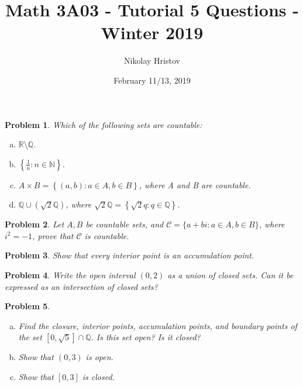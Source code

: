 \documentclass[11pt]{article}
\theoremstyle{plain}
\newtheorem{problem}{Problem}
\theoremstyle{remark}
\newcommand {\mbR} {\mathbb R}
\newcommand {\mbN} {\mathbb N}
\newcommand {\mbQ} {\mathbb Q}
\begin{document}
	\title{Math 3A03 - Tutorial 5 Questions - Winter 2019}
	\author{Nikolay Hristov}
	\date{February 11/13, 2019}
	\maketitle
	
		\begin{problem}
		Which of the following sets are countable:
		
		\begin{enumerate}[(a)]
			\item $\mbR \setminus \mbQ$.
			
			\item $\left\{ \frac 1 n : n \in \mbN \right\}$.
			
			\item $A\times B = \left\{ (a,b): a\in A, b\in B \right\}$, where A and B are countable.
			
			\item $\mbQ \cup \left(\sqrt 2 \mbQ \right)$, where $\sqrt 2 \mbQ = \left\{\sqrt 2 q: q\in \mbQ \right\}$.
		\end{enumerate}
	\end{problem}

	\begin{problem}
		Let $A,B$ be countable sets, and $\mathcal C=\{a+bi: a \in A,b\in B\}$, where $i^2=-1$, prove that $\mathcal C$ is countable.
	\end{problem}

	\begin{problem}
		Show that every interior point is an accumulation point.
	\end{problem}

	\begin{problem}
		Write the open interval $(0,2)$ as a union of closed sets. Can it be expressed as an intersection of closed sets?
	\end{problem}

	\begin{problem}
		
		\begin{enumerate} [(a)]
		\item Find the closure, interior points, accumulation points, and boundary points of the set $[0,\sqrt 5] \cap \mbQ$. Is this set open? Is it closed?
		
		\item Show that $(0,3)$ is open. 
		
		\item Show that $[0,3]$ is closed.
		
	\end{enumerate}
	\end{problem}


	
\end{document}
